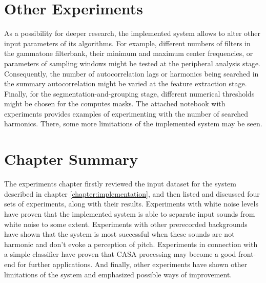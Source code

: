 \section{Other Experiments}

As a possibility for deeper research, the implemented system allows to alter other input parameters of its algorithms. For example, different numbers of filters in the gammatone filterbank, their minimum and maximum center frequencies, or parameters of sampling windows might be tested at the peripheral analysis stage. Consequently, the number of autocorrelation lags or harmonics being searched in the summary autocorrelation might be varied at the feature extraction stage. Finally, for the segmentation-and-grouping stage, different numerical thresholds might be chosen for the computes masks. The attached notebook with experiments provides examples of experimenting with the number of searched harmonics. There, some more limitations of the implemented system may be seen.

\section{Chapter Summary}

The experiments chapter firstly reviewed the input dataset for the system described in chapter \ref{chapter:implementation}, and then listed and discussed four sets of experiments, along with their results. Experiments with white noise levels have proven that the implemented system is able to separate input sounds from white noise to some extent. Experiments with other prerecorded backgrounds have shown that the system is most successful when these sounds are not harmonic and don't evoke a perception of pitch. Experiments in connection with a simple classifier have proven that CASA processing may become a good front-end for further applications. And finally, other experiments have shown other limitations of the system and emphasized possible ways of improvement.
